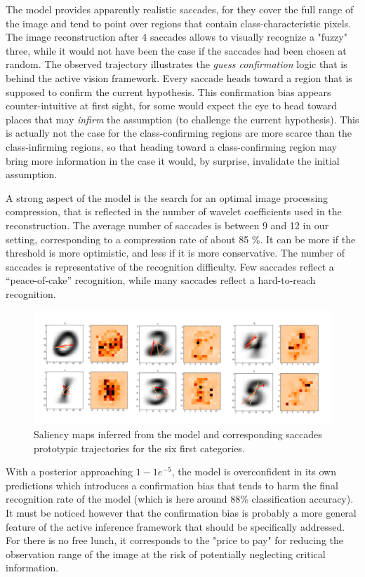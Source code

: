 \documentclass{article} %
\begin{document}
The model provides apparently realistic saccades, for they cover the full range of the image and tend to point over regions that contain class-characteristic pixels. The image reconstruction after 4 saccades allows to visually recognize a "fuzzy" three, while it would not have been the case if the saccades had been chosen at random.
The observed trajectory illustrates the \emph{guess confirmation} logic that is behind the active vision framework. Every saccade heads toward a region that is supposed to confirm the current hypothesis. This confirmation bias appears counter-intuitive at first sight, for some would expect the eye to head toward places that may \emph{infirm} the assumption (to challenge the current hypothesis). This is actually not the case for the class-confirming regions are more scarce than the class-infirming regions, so that heading toward a class-confirming region may bring more information in the case it would, by surprise, invalidate the initial assumption.

A strong aspect of the model is the search for an optimal image processing compression, that is reflected in the number of wavelet coefficients used in the reconstruction. The average number of saccades is between 9 and 12 in our setting, corresponding to a compression rate of about 85 \%. It can be more if the threshold is more optimistic, and less if it is more conservative. The number of saccades is representative of the recognition difficulty. Few saccades reflect a ``peace-of-cake'' recognition, while many saccades reflect a hard-to-reach recognition.  

\begin{figure}[t!]
	\centerline{
		\includegraphics[width = \linewidth]{img/ICLR-saliency-maps.png} 
	}
	\caption{Saliency maps inferred from the model and corresponding saccades prototypic trajectories for the six first categories.}\label{fig:saliency-maps}
\end{figure}

With a posterior approaching $1 - 1e^{-5}$, the model is overconfident in its own predictions which introduces a confirmation bias that tends to harm the final recognition rate of the model (which is here around 88\% classification accuracy). It must be noticed however that the confirmation bias is probably a more general feature of the active inference framework that should be specifically addressed. For there is no free lunch, it corresponds to the "price to pay" for reducing the observation range of the image at the risk of potentially neglecting critical information. 
\end{document}
